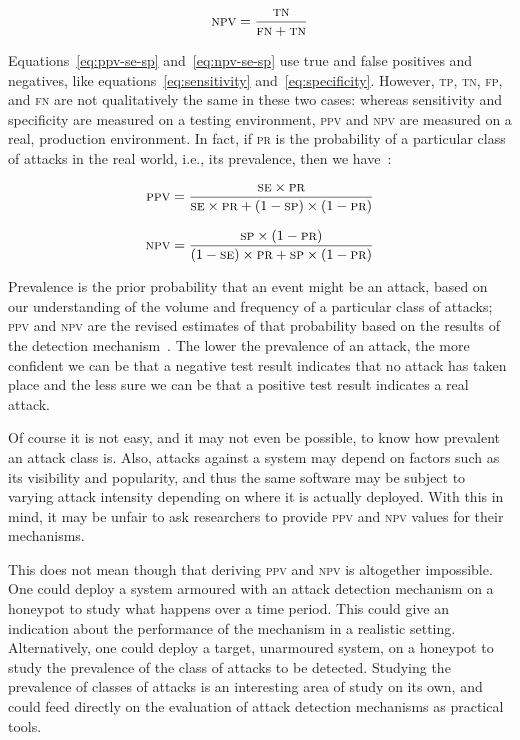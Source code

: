 \documentclass[conference]{IEEEtran}
\begin{document}
\begin{equation}
\textsc{npv} = \frac{\textsc{tn}}{\textsc{fn} + \textsc{tn}}
\end{equation}

\noindent
Equations~\ref{eq:ppv-se-sp} and~\ref{eq:npv-se-sp} use true and false
positives and negatives, like equations~\ref{eq:sensitivity}
and~\ref{eq:specificity}. However, \textsc{tp}, \textsc{tn},
\textsc{fp}, and \textsc{fn} are not qualitatively the same in these two cases:
whereas sensitivity and specificity are measured on a testing
environment, \textsc{ppv} and \textsc{npv} are measured on a real,
production environment. In fact, if \textsc{pr} is the probability of
a particular class of attacks in the real world,
i.e., its prevalence, then we
have~\cite{linn2004,altman1994}:

\begin{equation}
\textsc{ppv} = \frac{\textsc{se}\times \textsc{pr}}{
\textsc{se}\times \textsc{pr} + (1 - \textsc{sp})\times (1 -
\textsc{pr})}
\label{eq:ppv-se-sp}
\end{equation}

\begin{equation}
\textsc{npv} = \frac{\textsc{sp}\times (1 - \textsc{pr})}{
(1 - \textsc{se})\times \textsc{pr} + \textsc{sp}\times (1 -
\textsc{pr})}
\label{eq:npv-se-sp}
\end{equation}

\noindent
Prevalence is the prior probability that an event might be an attack,
based on our understanding of the volume and frequency of a particular
class of attacks; 
\textsc{ppv} and \textsc{npv} are the revised estimates of that
probability based on the results of the detection
mechanism~\cite{altman1994}. The lower the prevalence of an attack,
the more confident we can be that a negative test result indicates
that no attack has taken place and the less sure we can be that a
positive test result indicates a real attack. 

Of course it is not easy, and it may not even be possible, to know how
prevalent an attack class is. Also, attacks against a system may depend on
factors such as its visibility and popularity, and thus the same
software may be subject to varying attack intensity depending on
where it is actually deployed. With this in mind, it may be unfair to
ask researchers to provide \textsc{ppv} and \textsc{npv} values for
their mechanisms.

This does not mean though that deriving \textsc{ppv} and \textsc{npv} is
altogether impossible. One could deploy a system armoured with an
attack detection mechanism on a honeypot to study what happens over
a time period. This could give an indication about the performance of
the mechanism in a realistic setting. Alternatively, one could deploy a
target, unarmoured system, on a honeypot to study the prevalence of
the class of attacks to be detected. Studying the prevalence of
classes of attacks is an interesting area of study on its own,
and could feed directly on the evaluation of attack detection
mechanisms as practical tools.
\end{document}
